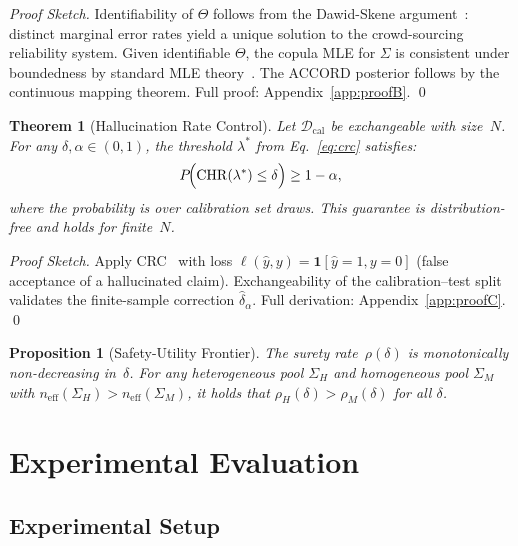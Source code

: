 \documentclass[conference]{IEEEtran}
\newtheorem{theorem}{Theorem}
\newtheorem{proposition}{Proposition}
\begin{document}
\begin{proof}[Proof Sketch]
Identifiability of $\Theta$ follows from the Dawid-Skene
argument~\cite{zhang2014}: distinct marginal error rates
yield a unique solution to the crowd-sourcing reliability system.
Given identifiable $\Theta$, the copula MLE for $\Sigma$ is
consistent under boundedness by standard MLE theory~\cite{nelsen2006}.
The ACCORD posterior follows by the continuous mapping theorem.
Full proof: Appendix~\ref{app:proofB}. \qed
\end{proof}

\begin{theorem}[Hallucination Rate Control]
\label{thm:guarantee}
Let $\mathcal{D}_\text{cal}$ be exchangeable with size~$N$.
For any $\delta, \alpha \in (0,1)$, the threshold $\lambda^*$
from Eq.~\eqref{eq:crc} satisfies:
\begin{equation}
  P\!\Bigl(\mathrm{CHR}(\lambda^*) \leq \delta\Bigr) \geq 1 - \alpha,
  \label{eq:guarantee}
\end{equation}
where the probability is over calibration set draws.
This guarantee is distribution-free and holds for finite~$N$.
\end{theorem}

\begin{proof}[Proof Sketch]
Apply CRC~\cite{angelopoulos2022crc} with loss
$\ell(\hat{y}, y) = \mathbf{1}[\hat{y}=1, y=0]$
(false acceptance of a hallucinated claim).
Exchangeability of the calibration--test split validates the
finite-sample correction $\hat{\delta}_\alpha$.
Full derivation: Appendix~\ref{app:proofC}. \qed
\end{proof}

\begin{proposition}[Safety-Utility Frontier]
\label{prop:frontier}
The surety rate~$\rho(\delta)$ is monotonically non-decreasing
in~$\delta$.
For any heterogeneous pool $\Sigma_H$ and homogeneous pool
$\Sigma_M$ with $n_\text{eff}(\Sigma_H) > n_\text{eff}(\Sigma_M)$,
it holds that $\rho_H(\delta) > \rho_M(\delta)$ for all $\delta$.
\end{proposition}

\section{Experimental Evaluation}
\label{sec:experiments}

\subsection{Experimental Setup}
\end{document}
